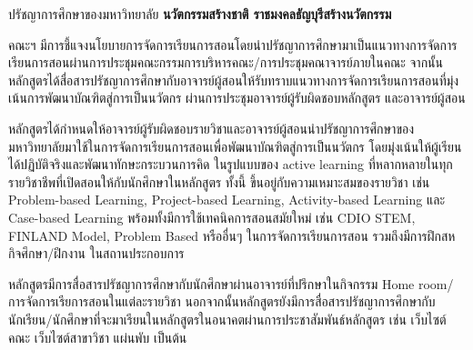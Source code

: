 \newpage
{}


ปรัชญาการศึกษาของมหาวิทยาลัย \textbf{นวัตกรรมสร้างชาติ ราชมงคลธัญบุรีสร้างนวัตกรรม}

คณะฯ มีการชี้แจงนโยบายการจัดการเรียนการสอนโดยนำปรัชญาการศึกษามาเป็นแนวทางการจัดการเรียนการสอนผ่านการประชุมคณะกรรมการบริหารคณะ/การประชุมคณาจารย์ภายในคณะ จากนั้นหลักสูตรได้สื่อสารปรัชญาการศึกษากับอาจารย์ผู้สอนให้รับทราบแนวทางการจัดการเรียนการสอนที่มุ่งเน้นการพัฒนาบัณฑิตสู่การเป็นนวัตกร ผ่านการประชุมอาจารย์ผู้รับผิดชอบหลักสูตร และอาจารย์ผู้สอน 

หลักสูตรได้กำหนดให้อาจารย์ผู้รับผิดชอบรายวิชาและอาจารย์ผู้สอนนำปรัชญาการศึกษาของมหาวิทยาลัยมาใช้ในการจัดการเรียนการสอนเพื่อพัฒนาบัณฑิตสู่การเป็นนวัตกร โดยมุ่งเน้นให้ผู้เรียนได้ปฏิบัติจริงและพัฒนาทักษะกระบวนการคิด ในรูปแบบของ active learning  ที่หลากหลายในทุกรายวิชาชีพที่เปิดสอนให้กับนักศึกษาในหลักสูตร ทั้งนี้ ขึ้นอยู่กับความเหมาะสมของรายวิชา เช่น Problem-based Learning, Project-based Learning, Activity-based Learning และ Case-based Learning  พร้อมทั้งมีการใช้เทคนิคการสอนสมัยใหม่ เช่น CDIO STEM, FINLAND Model, Problem Based หรืออื่นๆ ในการจัดการเรียนการสอน รวมถึงมีการฝึกสหกิจศึกษา/ฝึกงาน ในสถานประกอบการ 

หลักสูตรมีการสื่อสารปรัชญาการศึกษากับนักศึกษาผ่านอาจารย์ที่ปรึกษาในกิจกรรม Home room/การจัดการเรียการสอนในแต่ละรายวิชา นอกจากนั้นหลักสูตรยังมีการสื่อสารปรัชญาการศึกษากับนักเรียน/นักศึกษาที่จะมาเรียนในหลักสูตรในอนาคตผ่านการประชาสัมพันธ์หลักสูตร เช่น เว็บไซต์คณะ เว็บไซต์สาขาวิชา แผ่นพับ เป็นต้น

\begin{doclist}
\end{doclist}

